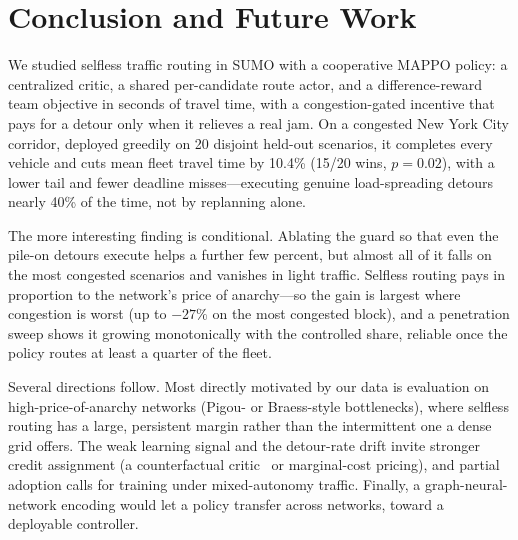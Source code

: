 \section{Conclusion and Future Work}
We studied selfless traffic routing in SUMO with a cooperative MAPPO policy: a
centralized critic, a shared per-candidate route actor, and a difference-reward team
objective in seconds of travel time, with a congestion-gated incentive that pays for a
detour only when it relieves a real jam. On a congested New York City corridor, deployed
greedily on 20 disjoint held-out scenarios, it completes every vehicle and cuts mean fleet
travel time by 10.4\% (15/20 wins, $p{=}0.02$), with a lower tail and fewer deadline
misses---executing genuine load-spreading detours nearly 40\% of the time, not by
replanning alone.

The more interesting finding is conditional. Ablating the guard so that even the pile-on
detours execute helps a further few percent, but almost all of it falls on the most
congested scenarios and vanishes in light traffic. Selfless routing pays in proportion to
the network's price of anarchy---so the gain is largest where congestion is worst (up to
$-27\%$ on the most congested block), and a penetration sweep shows it growing monotonically
with the controlled share, reliable once the policy routes at least a quarter of the fleet.

Several directions follow. Most directly motivated by our data is evaluation on
high-price-of-anarchy networks (Pigou- or Braess-style bottlenecks), where selfless routing
has a large, persistent margin rather than the intermittent one a dense grid offers. The
weak learning signal and the detour-rate drift invite stronger credit assignment (a
counterfactual critic~\citep{foerster2018coma} or marginal-cost pricing), and partial
adoption calls for training under mixed-autonomy traffic. Finally, a graph-neural-network
encoding would let a policy transfer across networks, toward a deployable controller.
